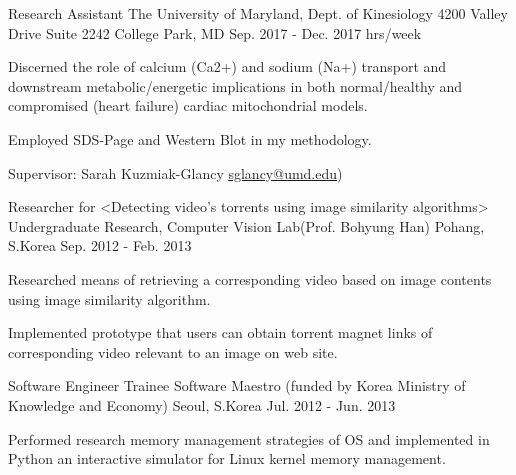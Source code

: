 \begin{cventries}


  \cventry
    {Research Assistant} %
    {The University of Maryland, Dept. of Kinesiology} %
    {4200 Valley Drive \newline Suite 2242 \newline College Park, MD} %
    {Sep. 2017 - Dec. 2017  hrs/week} %
    {
      \begin{cvitems} %
        \item {Discerned the role of calcium (Ca2+) and sodium (Na+) transport and downstream metabolic/energetic implications in both normal/healthy and compromised (heart failure) cardiac mitochondrial models.}
        \item{Employed SDS-Page and Western Blot in my methodology.}
        \item{Supervisor: Sarah Kuzmiak-Glancy
        {\underline{\href{mailto:sglancy@umd.edu}{sglancy@umd.edu}}})}
      \end{cvitems}
    }


  \cventry
    {Researcher for <Detecting video’s torrents using image similarity algorithms>} %
    {Undergraduate Research, Computer Vision Lab(Prof. Bohyung Han)} %
    {Pohang, S.Korea} %
    {Sep. 2012 - Feb. 2013} %
    {
      \begin{cvitems} %
        \item {Researched means of retrieving a corresponding video based on image contents using image similarity algorithm.}
        \item {Implemented prototype that users can obtain torrent magnet links of corresponding video relevant to an image on web site.}
      \end{cvitems}
    }

  \cventry
    {Software Engineer Trainee} %
    {Software Maestro (funded by Korea Ministry of Knowledge and Economy)} %
    {Seoul, S.Korea} %
    {Jul. 2012 - Jun. 2013} %
    {
      \begin{cvitems} %
        \item {Performed research memory management strategies of OS and implemented in Python an interactive simulator for Linux kernel memory management.}
      \end{cvitems}
    }


\end{cventries}
